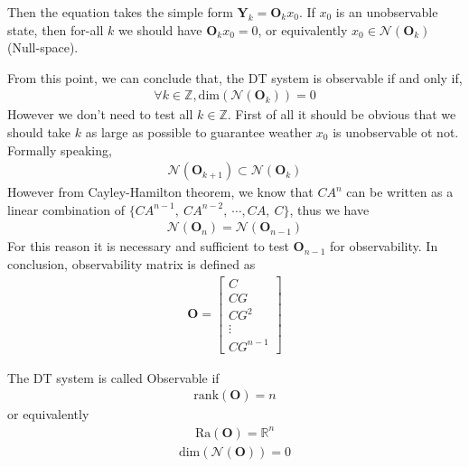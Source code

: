 \documentclass[twoside]{article}
\begin{document}
%
Then the equation takes the simple form $\mathbf{Y}_k = \mathbf{O}_k
x_0$. If $x_0$ is an unobservable state, then for-all $k$ we should have
$\mathbf{O}_k x_0 = 0$, or equivalently $x_0 \in \mathcal{N} \left(
  \mathbf{O}_k \right)$ (Null-space). 

From this point, we can conclude that, the DT system is observable if
and only if, 
%
\begin{align*}
  \forall k \in \mathbb{Z}, \mathrm{dim} \left( \mathcal{N} \left(
  \mathbf{O}_k \right) \right) = 0
\end{align*}
%
However we don't need to test all $k \in \mathbb{Z}$. First of all
it should be obvious that we should take $k$ as large as possible
to guarantee weather $x_0$ is unobservable ot not. Formally speaking,
%
\begin{align*}
 \mathcal{N} \left( \mathbf{O}_{k+1} \right) \subset \mathcal{N} \left( \mathbf{O}_{k} \right)
\end{align*}
%
However from Cayley-Hamilton theorem, we know that $C A^n$ can be
written as a linear combination of $\lbrace C A^{n-1} , \ C A^{n-2} ,
\ \cdots , C A , \ C\rbrace$, thus we have 
%
%
\begin{align*}
 \mathcal{N} \left( \mathbf{O}_{n} \right) = \mathcal{N} \left( \mathbf{O}_{n-1} \right)
\end{align*}
%
For this reason it is necessary and sufficient to test $\mathbf{O}_{n-1}$
for observability. In conclusion, observability matrix is defined as
%
\begin{align*}
  \mathbf{O} =
\left[ \begin{array}{c}
C 
\\
C G 
\\
C G^2 
\\
  \vdots
\\
C G^{n-1}
\end{array}
\right] 
\end{align*}

The DT system is called Observable if
%
\begin{align*}
  \mathrm{rank} \left( \mathbf{O} \right) = n
\end{align*}
%
or equivalently 
%
\begin{align*}
  \mathrm{Ra} \left( \mathbf{O} \right) = \mathbb{R}^n
\end{align*}
%
\begin{align*}
 \mathrm{dim} \left ( \mathcal{N} ( \mathbf{O} ) \right) = 0
\end{align*} 
\end{document}
